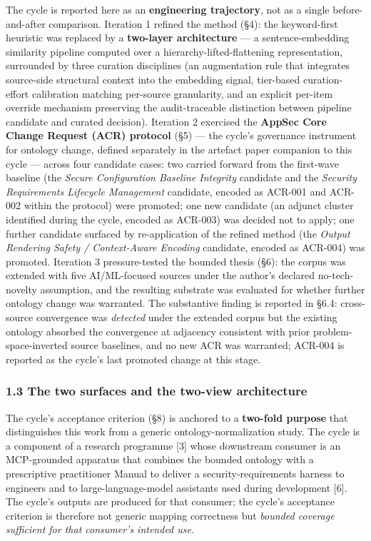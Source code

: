 \documentclass[
]{article}
\begin{document}
The cycle is reported here as an \textbf{engineering trajectory}, not as
a single before-and-after comparison. Iteration 1 refined the method
(§4): the keyword-first heuristic was replaced by a \textbf{two-layer
architecture} --- a sentence-embedding similarity pipeline computed over
a hierarchy-lifted-flattening representation, surrounded by three
curation disciplines (an augmentation rule that integrates source-side
structural context into the embedding signal, tier-based curation-effort
calibration matching per-source granularity, and an explicit per-item
override mechanism preserving the audit-traceable distinction between
pipeline candidate and curated decision). Iteration 2 exercised the
\textbf{AppSec Core Change Request (ACR) protocol} (§5) --- the cycle's
governance instrument for ontology change, defined separately in the
artefact paper companion to this cycle --- across four candidate cases:
two carried forward from the first-wave baseline (the \emph{Secure
Configuration Baseline Integrity} candidate and the \emph{Security
Requirements Lifecycle Management} candidate, encoded as ACR-001 and
ACR-002 within the protocol) were promoted; one new candidate (an
adjunct cluster identified during the cycle, encoded as ACR-003) was
decided not to apply; one further candidate surfaced by re-application
of the refined method (the \emph{Output Rendering Safety / Context-Aware
Encoding} candidate, encoded as ACR-004) was promoted. Iteration 3
pressure-tested the bounded thesis (§6): the corpus was extended with
five AI/ML-focused sources under the author's declared no-tech-novelty
assumption, and the resulting substrate was evaluated for whether
further ontology change was warranted. The substantive finding is
reported in §6.4: cross-source convergence was \emph{detected} under the
extended corpus but the existing ontology absorbed the convergence at
adjacency consistent with prior problem-space-inverted source baselines,
and no new ACR was warranted; ACR-004 is reported as the cycle's last
promoted change at this stage.

\subsubsection{1.3 The two surfaces and the two-view
architecture}\label{the-two-surfaces-and-the-two-view-architecture}

The cycle's acceptance criterion (§8) is anchored to a \textbf{two-fold
purpose} that distinguishes this work from a generic
ontology-normalization study. The cycle is a component of a research
programme {[}3{]} whose downstream consumer is an MCP-grounded apparatus
that combines the bounded ontology with a prescriptive practitioner
Manual to deliver a security-requirements harness to engineers and to
large-language-model assistants used during development {[}6{]}. The
cycle's outputs are produced for that consumer; the cycle's acceptance
criterion is therefore not generic mapping correctness but \emph{bounded
coverage sufficient for that consumer's intended use}.
\end{document}
